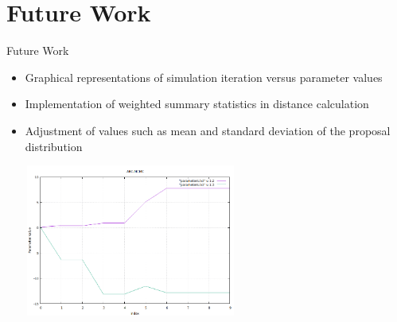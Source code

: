 \documentclass{beamer}
\begin{document}
	
	

		
		

	\section{Future Work}
	\begin{frame}{Future Work}
		
		\begin{itemize}
			\item Graphical representations of simulation iteration versus parameter values 
			\item Implementation of weighted summary statistics in distance calculation
			\item Adjustment of values such as mean and standard deviation of the proposal distribution
			
			\centering\includegraphics[width=7cm, height=5cm]{graph.png}
			
		\end{itemize}
		
	\end{frame}
\end{document}
